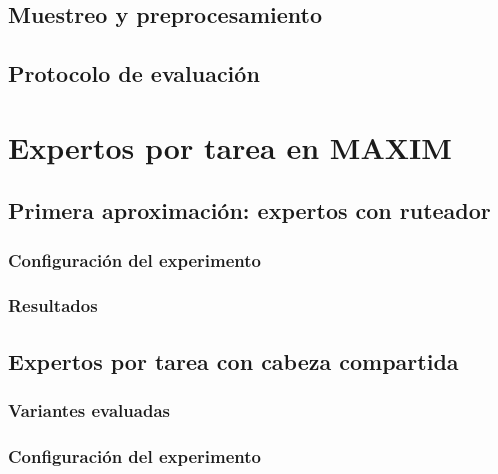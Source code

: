\documentclass[
  11pt,
  oneside,
  english,
  spanish,
  singlespacing,
  headsepline
]{MastersDoctoralThesis}
\begin{document}
\section{Muestreo y preprocesamiento}
\label{sec:muestreo}

\section{Protocolo de evaluación}
\label{sec:protocolo}

\chapter{Expertos por tarea en MAXIM}
\label{chap:expertos}

\section{Primera aproximación: expertos con ruteador}
\label{sec:moe-ruteador}

\subsection{Configuración del experimento}
\label{sec:moe-ruteador-config}

\subsection{Resultados}
\label{sec:moe-ruteador-resultados}

\section{Expertos por tarea con cabeza compartida}
\label{sec:shared}

\subsection{Variantes evaluadas}
\label{sec:shared-variantes}

\subsection{Configuración del experimento}
\label{sec:shared-config}
\end{document}
